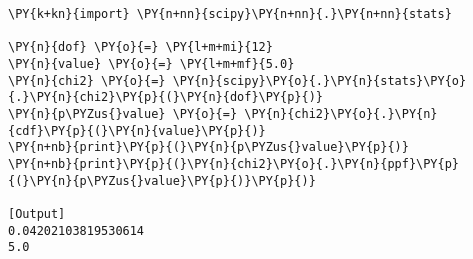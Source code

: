 \begin{Verbatim}[label=\makebox{\href{https://bitbucket.org/lbaldini/statnotes/src/master/snippets/scipy.stats.chi2.py}{https://bitbucket.org/.../scipy.stats.chi2.py}},commandchars=\\\{\}]
\PY{k+kn}{import} \PY{n+nn}{scipy}\PY{n+nn}{.}\PY{n+nn}{stats}

\PY{n}{dof} \PY{o}{=} \PY{l+m+mi}{12}
\PY{n}{value} \PY{o}{=} \PY{l+m+mf}{5.0}
\PY{n}{chi2} \PY{o}{=} \PY{n}{scipy}\PY{o}{.}\PY{n}{stats}\PY{o}{.}\PY{n}{chi2}\PY{p}{(}\PY{n}{dof}\PY{p}{)}
\PY{n}{p\PYZus{}value} \PY{o}{=} \PY{n}{chi2}\PY{o}{.}\PY{n}{cdf}\PY{p}{(}\PY{n}{value}\PY{p}{)}
\PY{n+nb}{print}\PY{p}{(}\PY{n}{p\PYZus{}value}\PY{p}{)}
\PY{n+nb}{print}\PY{p}{(}\PY{n}{chi2}\PY{o}{.}\PY{n}{ppf}\PY{p}{(}\PY{n}{p\PYZus{}value}\PY{p}{)}\PY{p}{)}

[Output]
0.04202103819530614
5.0
\end{Verbatim}